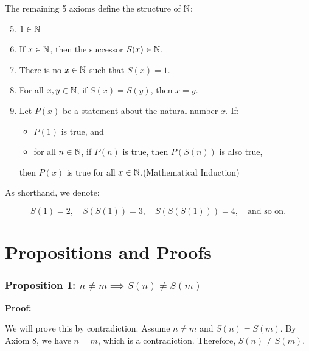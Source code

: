 The remaining 5 axioms define the structure of \( \mathbb{N} \):

\begin{enumerate}[label=\Roman*.]
	\setcounter{enumi}{4}

	\item \( 1 \in \mathbb{N} \)
	
	\item If \( x \in \mathbb{N} \), then the successor \( S(x) \in \mathbb{N} \).
	
	\item There is no \( x \in \mathbb{N} \) such that \( S(x) = 1 \).
	
	\item For all \( x, y \in \mathbb{N} \), if \( S(x) = S(y) \), then \( x = y \).
	
	\item Let \( P(x) \) be a statement about the natural number \(x\). If:
	
		\begin{itemize}
	
			\item \( P(1) \) is true, and
	
			\item for all \( n \in \mathbb{N} \), if \( P(n) \) is true, then \( P(S(n)) \) is also true,
	
		\end{itemize}
	
		then \( P(x) \) is true for all \( x \in \mathbb{N} \).\hfill (Mathematical Induction)
\end{enumerate}

As shorthand, we denote:

\[
	S(1) = 2, \quad S(S(1)) = 3, \quad S(S(S(1))) = 4, \quad \text{and so on.}
\]

\section{Propositions and Proofs}

\subsubsection{Proposition 1: \texorpdfstring{\(n \ne m \implies S(n) \ne S(m)\)}{n!= m implies S (n)!=S (m)}}

\textbf{Proof:} 

We will prove this by contradiction. Assume \( n \ne m \) and \( S(n) = S(m) \). 
By Axiom 8, we have \( n = m \), which is a contradiction. Therefore, \( S(n) \ne S(m) \).

